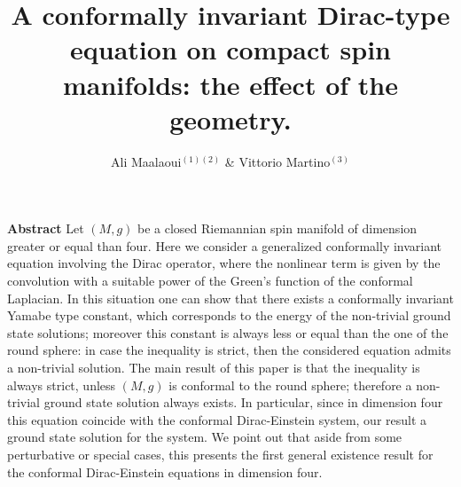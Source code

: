 \documentclass[11pt]{article}
\begin{document}
\title{A conformally invariant Dirac-type equation on compact spin manifolds: the effect of the geometry.}

\author{ Ali Maalaoui$^{(1)(2)}$ \& Vittorio Martino$^{(3)}$}
\begin{NoHyper}
\addtocounter{footnote}{1}
\addtocounter{footnote}{1}
\addtocounter{footnote}{1}
\end{NoHyper}




\date{}
\maketitle


\vspace{5mm}


{\noindent\bf Abstract}  {\small Let $(M,g)$ be a closed Riemannian spin manifold of dimension greater or equal than four. Here we consider a generalized conformally invariant equation involving the Dirac operator, where the nonlinear term is given by the convolution with a suitable power of the Green’s function of the conformal Laplacian. In this situation one can show that there exists a conformally invariant Yamabe type constant, which corresponds to the energy of the non-trivial ground state solutions; moreover this constant is always less or equal than the one of the round sphere: in case the inequality is strict, then the considered equation admits a non-trivial solution. The main result of this paper is that the inequality is always strict, unless $(M,g)$ is conformal to the round sphere; therefore a non-trivial ground state solution always exists. In particular, since in dimension four this equation coincide with the conformal Dirac-Einstein system, our result a ground state solution for the system. We point out that aside from some perturbative or special cases, this presents the first general existence result for the conformal Dirac-Einstein equations in dimension four.}

\vspace{5mm}
\end{document}
